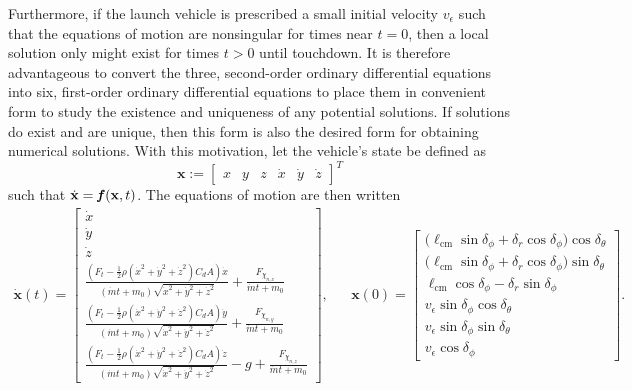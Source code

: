 \documentclass[11pt]{thesis}
\numberwithin{equation}{section}
\begin{document}
Furthermore, if the launch vehicle is prescribed a small initial velocity $v_\epsilon$ such that the equations of motion are nonsingular for times near $t = 0$, then a local solution only might exist for times $t > 0$ until touchdown. It is therefore advantageous to convert the three, second-order ordinary differential equations into six, first-order ordinary differential equations to place them in convenient form to study the existence and uniqueness of any potential solutions. If solutions do exist and are unique, then this form is also the desired form for obtaining numerical solutions. With this motivation, let the vehicle's state be defined as
\begin{equation}
\mathbf{x} := \begin{bmatrix}x & y & z & \dot{x} & \dot{y} & \dot{z}\end{bmatrix}^T
\end{equation}
such that $\dot{\mathbf{x}} = \textit{\textbf{f}}\hspace{0.4ex}(\mathbf{x}, t)$. The equations of motion are then written
\begin{align}
\dot{\mathbf{x}}(t) = \begin{bmatrix}\dot{x} \\ \dot{y} \\ \dot{z} \\ \frac{\left(F_t -  \frac{1}{2} \rho (\dot{x}^2 + \dot{y}^2 + \dot{z}^2) C_d A\right)\dot{x}}{(\dot{m} t + m_0)\sqrt{\dot{x}^2 + \dot{y}^2 + \dot{z}^2}} + \frac{F_{\chi_{n,x}}}{\dot{m}t + m_0} \\ \frac{\left(F_t - \frac{1}{2} \rho (\dot{x}^2 + \dot{y}^2 + \dot{z}^2) C_d A\right)\dot{y}}{(\dot{m} t + m_0)\sqrt{\dot{x}^2 + \dot{y}^2 + \dot{z}^2}} + \frac{F_{\chi_{n,y}}}{\dot{m}t + m_0} \\ \frac{\left(F_t - \frac{1}{2} \rho (\dot{x}^2 + \dot{y}^2 + \dot{z}^2) C_d A\right)\dot{z}}{(\dot{m} t + m_0)\sqrt{\dot{x}^2 + \dot{y}^2 + \dot{z}^2}} - g + \frac{F_{\chi_{n,z}}}{\dot{m}t + m_0}\end{bmatrix}, && \mathbf{x}(0) = \begin{bmatrix} \big(\ell_{\mathrm{cm}} \sin \delta_\phi + \delta_r \cos \delta_\phi\big) \cos\delta_\theta \\ \big(\ell_{\mathrm{cm}} \sin \delta_\phi + \delta_r \cos \delta_\phi\big) \sin\delta_\theta \\ \ell_{\mathrm{cm}} \cos \delta_\phi - \delta_r \sin \delta_\phi \\ v_{\epsilon}\sin\delta_{\phi}\cos\delta_\theta \\ v_{\epsilon}\sin\delta_{\phi}\sin\delta_\theta \\ v_{\epsilon}\cos\delta_{\phi} \end{bmatrix}.
\end{align}
\end{document}
